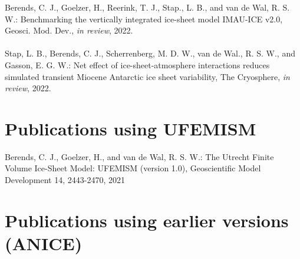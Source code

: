 \documentclass{article}
\begin{document}
Berends, C. J., Goelzer, H., Reerink, T. J., Stap., L. B., and van de Wal, R. S. W.: Benchmarking the vertically integrated ice-sheet model IMAU-ICE v2.0, Geosci. Mod. Dev., \textit{in review}, 2022.\\
\\
Stap, L. B., Berends, C. J., Scherrenberg, M. D. W., van de Wal., R. S. W., and Gasson, E. G. W.: Net effect of ice-sheet-atmosphere interactions reduces simulated transient Miocene Antarctic ice sheet variability, The Cryosphere, \textit{in review}, 2022.

\section{Publications using UFEMISM}

Berends, C. J., Goelzer, H., and van de Wal, R. S. W.: The Utrecht Finite Volume Ice-Sheet Model: UFEMISM (version 1.0), Geoscientific Model Development 14, 2443-2470, 2021

\section{Publications using earlier versions (ANICE)}
\end{document}
